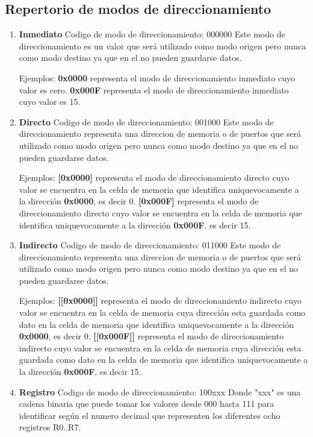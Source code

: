 \subsection{Repertorio de modos de direccionamiento}

\begin{enumerate}

\item \textbf{Inmediato}
Codigo de modo de direccionamiento: 000000
Este modo de direccionamiento es un valor que será utilizado como modo origen pero nunca como modo destino ya que en el no pueden guardarse datos.

Ejemplos:
\textbf{0x0000} representa el modo de direccionamiento inmediato cuyo valor es cero.
\textbf{0x000F} representa el modo de direccionamiento inmediato cuyo valor es 15.

\item \textbf{Directo}
Codigo de modo de direccionamiento: 001000
Este modo de direccionamiento representa una direccion de memoria o de puertos que será utilizado como modo origen pero nunca como modo destino ya que en el no pueden guardarse datos.

Ejemplos:
\textbf{[0x0000]} representa el modo de direccionamiento directo cuyo valor se encuentra en la celda de memoria que identifica uniquevocamente a la dirección \textbf{0x0000}, es decir 0.
\textbf{[0x000F]} representa el modo de direccionamiento directo cuyo valor se encuentra en la celda de memoria que identifica uniquevocamente a la dirección \textbf{0x000F}, es decir 15.

\item \textbf{Indirecto}
Codigo de modo de direccionamiento: 011000
Este modo de direccionamiento representa una direccion de memoria o de puertos que será utilizado como modo origen pero nunca como modo destino ya que en el no pueden guardarse datos.

Ejemplos:
\textbf{[[0x0000]]} representa el modo de direccionamiento indirecto cuyo valor se encuentra en la celda de memoria cuya dirección esta guardada como dato en la celda de memoria que identifica uniquevocamente a la dirección \textbf{0x0000}, es decir 0.
\textbf{[[0x000F]]} representa el modo de direccionamiento indirecto cuyo valor se encuentra en la celda de memoria cuya dirección esta guardada como dato en la celda de memoria que identifica uniquevocamente a la dirección \textbf{0x000F}, es decir 15.

\item \textbf{Registro}
Codigo de modo de direccionamiento: 100xxx 
Donde "xxx" es una cadena binaria que puede tomar los valores desde 000 hasta 111 para identificar según el numero decimal que representen los diferentes ocho registros R0..R7.


\end{enumerate}

